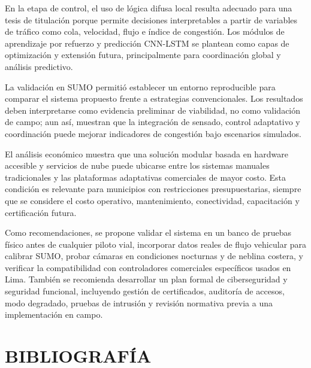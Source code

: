 \documentclass[12pt,a4paper,oneside]{report}
\begin{document}
En la etapa de control, el uso de lógica difusa local resulta adecuado para una tesis de titulación porque permite decisiones interpretables a partir de variables de tráfico como cola, velocidad, flujo e índice de congestión. Los módulos de aprendizaje por refuerzo y predicción CNN-LSTM se plantean como capas de optimización y extensión futura, principalmente para coordinación global y análisis predictivo.

La validación en SUMO permitió establecer un entorno reproducible para comparar el sistema propuesto frente a estrategias convencionales. Los resultados deben interpretarse como evidencia preliminar de viabilidad, no como validación de campo; aun así, muestran que la integración de sensado, control adaptativo y coordinación puede mejorar indicadores de congestión bajo escenarios simulados.

El análisis económico muestra que una solución modular basada en hardware accesible y servicios de nube puede ubicarse entre los sistemas manuales tradicionales y las plataformas adaptativas comerciales de mayor costo. Esta condición es relevante para municipios con restricciones presupuestarias, siempre que se considere el costo operativo, mantenimiento, conectividad, capacitación y certificación futura.

Como recomendaciones, se propone validar el sistema en un banco de pruebas físico antes de cualquier piloto vial, incorporar datos reales de flujo vehicular para calibrar SUMO, probar cámaras en condiciones nocturnas y de neblina costera, y verificar la compatibilidad con controladores comerciales específicos usados en Lima. También se recomienda desarrollar un plan formal de ciberseguridad y seguridad funcional, incluyendo gestión de certificados, auditoría de accesos, modo degradado, pruebas de intrusión y revisión normativa previa a una implementación en campo.

\chapter*{BIBLIOGRAFÍA}\label{bibliografuxeda}
\end{document}
